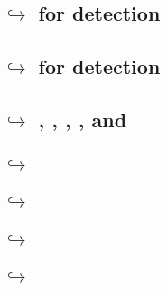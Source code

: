 \subsection{\hubMod{} $\hookrightarrow$ \wcpMod{} for \suxSH{} detection                                    \lispDone      {}} \label{hub: lookups: into wcp for stack underflow}             
\subsection{\hubMod{} $\hookrightarrow$ \wcpMod{} for \soxSH{} detection                                    \lispDone      {}} \label{hub: lookups: into wcp for stack overflow}              
\subsection{\hubMod{} $\hookrightarrow$ \addMod{}, \binMod{}, \modMod{}, \mulMod{}, \shfMod{} and \wcpMod{} \lispDone      {}} \label{hub: lookups: into the 2 argument stateless modules}    
\subsection{\hubMod{} $\hookrightarrow$ \extMod{}                                                           \lispDone      {}} \label{hub: lookups: into ext}                                 
\subsection{\hubMod{} $\hookrightarrow$ \btcMod{}                                                           \lispCommented {}} \label{hub: lookups: into block data}                          
\subsection{\hubMod{} $\hookrightarrow$ \blockHashMod{}                                                     \lispCommented {}} \label{hub: lookups: into block hash}                          
\subsection{\hubMod{} $\hookrightarrow$ \trmMod{}                                                           \lispDone      {}} \label{hub: lookups: into trm}                                 
